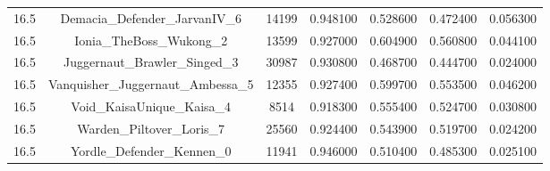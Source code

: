 \begin{table}[htbp]
\begin{tabular}{lcccccc}
16.5 & Demacia\_Defender\_JarvanIV\_6 & 14199 & 0.948100 & 0.528600 & 0.472400 & 0.056300 \\
16.5 & Ionia\_TheBoss\_Wukong\_2 & 13599 & 0.927000 & 0.604900 & 0.560800 & 0.044100 \\
16.5 & Juggernaut\_Brawler\_Singed\_3 & 30987 & 0.930800 & 0.468700 & 0.444700 & 0.024000 \\
16.5 & Vanquisher\_Juggernaut\_Ambessa\_5 & 12355 & 0.927400 & 0.599700 & 0.553500 & 0.046200 \\
16.5 & Void\_KaisaUnique\_Kaisa\_4 & 8514 & 0.918300 & 0.555400 & 0.524700 & 0.030800 \\
16.5 & Warden\_Piltover\_Loris\_7 & 25560 & 0.924400 & 0.543900 & 0.519700 & 0.024200 \\
16.5 & Yordle\_Defender\_Kennen\_0 & 11941 & 0.946000 & 0.510400 & 0.485300 & 0.025100 \\
\bottomrule
\end{tabular}
\end{table}
